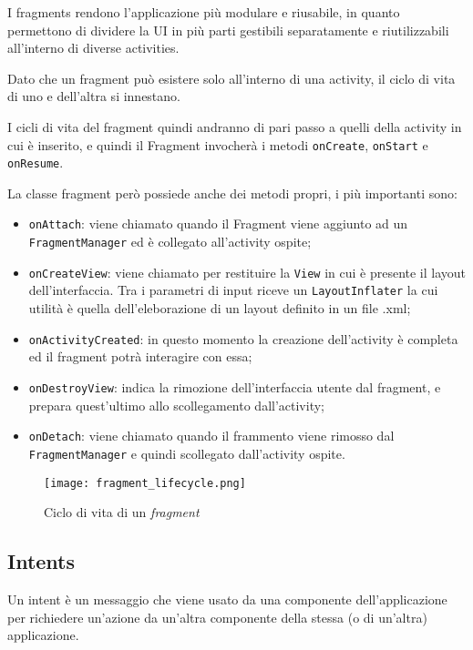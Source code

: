 I fragments rendono l'applicazione più modulare e riusabile, in quanto permettono di dividere la UI in più parti gestibili separatamente e riutilizzabili all'interno di diverse activities. \cite{fragments}

Dato che un fragment può esistere solo all'interno di una activity, il ciclo di vita di uno e dell'altra si innestano.

I cicli di vita del fragment quindi andranno di pari passo a quelli della activity in cui è inserito, e quindi il Fragment invocherà i metodi
\texttt{onCreate}, \texttt{onStart} e \texttt{onResume}. \cite{fragment-lifecycle} \cite{framents-lifecycle-2}

La classe fragment però possiede anche dei metodi propri, i più importanti sono:

\begin{itemize}
    \item \texttt{onAttach}: viene chiamato quando il Fragment viene aggiunto ad un \texttt{FragmentManager} ed è collegato all'activity ospite;
    \item \texttt{onCreateView}: viene chiamato per restituire la \texttt{View} in cui è presente il layout dell'interfaccia. Tra i parametri di input riceve un \texttt{LayoutInflater} la cui utilità è quella dell'eleborazione di un layout definito in un file .xml;
    \item \texttt{onActivityCreated}: in questo momento la creazione dell'activity è completa ed il fragment potrà interagire con essa;
    \item \texttt{onDestroyView}: indica la rimozione dell'interfaccia utente dal fragment, e prepara quest'ultimo allo scollegamento dall'activity;
    \item \texttt{onDetach}: viene chiamato quando il frammento viene rimosso dal \texttt{FragmentManager} e quindi scollegato dall'activity ospite.
\end{itemize}
\begin{figure}[H]
\centering
\texttt{[image: fragment\_lifecycle.png]}
\caption{Ciclo di vita di un \emph{fragment}}
\end{figure}

\hypertarget{intents}{%
\subsection{Intents}\label{intents}}

Un intent è un messaggio che viene usato da una componente dell'applicazione per richiedere un'azione da un'altra componente della stessa (o di un'altra) applicazione. \cite{intents}

